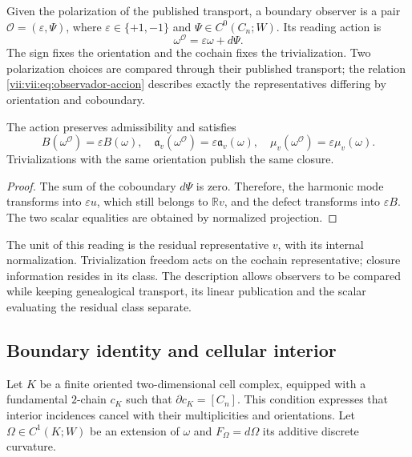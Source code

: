 \begin{definition}
\label{vii:vii:def:observador-borde}
Given the polarization of the published transport, a boundary observer
is a pair \(\mathcal O=(\varepsilon,\Psi)\), where
\(\varepsilon\in\{+1,-1\}\) and \(\Psi\in C^0(C_n;W)\).
Its reading action is
\begin{equation}
 \omega^{\mathcal O}=\varepsilon\omega+d\Psi.
 \label{vii:vii:eq:observador-accion}
\end{equation}
The sign fixes the orientation and the cochain fixes the trivialization.
Two polarization choices are compared through their published
transport; the relation \eqref{vii:vii:eq:observador-accion} describes
exactly the representatives differing by orientation and coboundary.
\end{definition}

\begin{proposition}
\label{vii:vii:prop:observador-covarianza}
The action preserves admissibility and satisfies
\[
 B(\omega^{\mathcal O})=\varepsilon B(\omega),\quad
 \mathfrak a_v(\omega^{\mathcal O})=\varepsilon\mathfrak a_v(\omega),
 \quad \mu_v(\omega^{\mathcal O})=\varepsilon\mu_v(\omega).
\]
Trivializations with the same orientation publish the same closure.
\end{proposition}

\begin{proof}
The sum of the coboundary \(d\Psi\) is zero. Therefore, the harmonic mode
transforms into \(\varepsilon u\), which still belongs to
\(\mathbb Rv\), and the defect transforms into \(\varepsilon B\).
The two scalar equalities are obtained by normalized projection.
\end{proof}

The unit of this reading is the residual representative \(v\), with its
internal normalization. Trivialization freedom acts on the
cochain representative; closure information resides in its
class. The description allows observers to be compared while keeping
genealogical transport, its linear publication and the scalar
evaluating the residual class separate.

\subsection{Boundary identity and cellular interior}
\label{vii:vii:sec:observador-stokes}

Let \(K\) be a finite oriented two-dimensional cell complex,
equipped with a fundamental \(2\)-chain \(c_K\) such that
\(\partial c_K=[C_n]\). This condition expresses that interior
incidences cancel with their multiplicities and orientations.
Let \(\Omega\in C^1(K;W)\) be an extension of \(\omega\) and
\(F_\Omega=d\Omega\) its additive discrete curvature.

